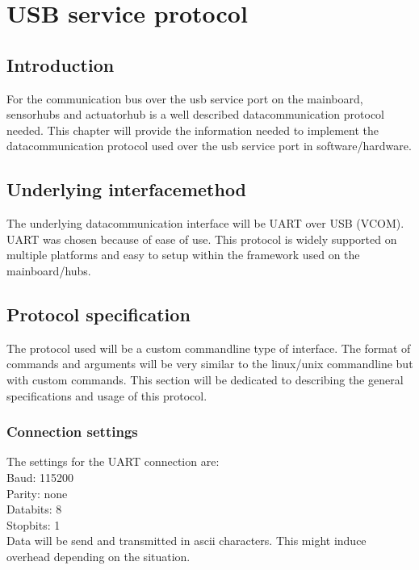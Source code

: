 \chapter{USB service protocol}
\label{appendix::usb_service_protocol}
\section{Introduction}
For the communication bus over the usb service port on the mainboard, sensorhubs and actuatorhub is a well described datacommunication protocol needed. This chapter will provide the information needed to implement the datacommunication protocol used over the usb service port in software/hardware.
\section{Underlying interfacemethod}
The underlying datacommunication interface will be UART over USB (VCOM). UART was chosen because of ease of use. This protocol is widely supported on multiple platforms and easy to setup within the framework used on the mainboard/hubs.
\section{Protocol specification}
The protocol used will be a custom commandline type of interface. The format of commands and arguments will be very similar to the linux/unix commandline but with custom commands. This section will be dedicated to describing the general specifications and usage of this protocol.
\subsection{Connection settings}
The settings for the UART connection are:\\
Baud: 115200\\
Parity: none \\
Databits: 8\\
Stopbits: 1\\
Data will be send and transmitted in ascii characters. This might induce overhead depending on the situation.

